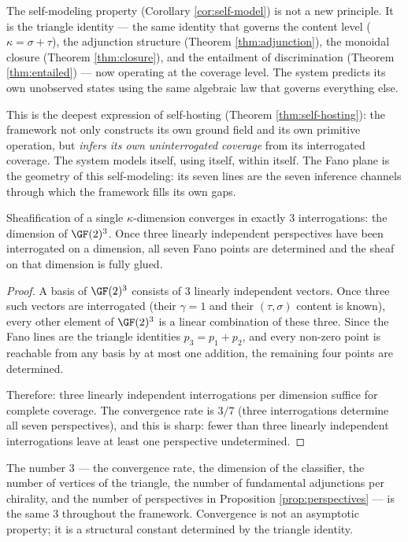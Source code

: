 \begin{remark}
The self-modeling property (Corollary \ref{cor:self-model})
is not a new principle. It is the triangle identity ---
the same identity that governs the content level
($\kappa = \sigma + \tau$), the adjunction structure
(Theorem \ref{thm:adjunction}), the monoidal closure
(Theorem \ref{thm:closure}), and the entailment of
discrimination (Theorem \ref{thm:entailed}) --- now
operating at the coverage level. The system predicts its
own unobserved states using the same algebraic law that
governs everything else.

This is the deepest expression of self-hosting
(Theorem \ref{thm:self-hosting}): the framework not only
constructs its own ground field and its own primitive
operation, but \emph{infers its own uninterrogated
coverage} from its interrogated coverage. The system
models itself, using itself, within itself. The Fano
plane is the geometry of this self-modeling: its seven
lines are the seven inference channels through which
the framework fills its own gaps.
\end{remark}

\begin{theorem}\label{thm:convergence}
Sheafification of a single $\kappa$-dimension converges in
exactly $3$ interrogations: the dimension of $\GF(2)^3$.
Once three linearly independent perspectives have been
interrogated on a dimension, all seven Fano points are
determined and the sheaf on that dimension is fully glued.
\end{theorem}

\begin{proof}
A basis of $\GF(2)^3$ consists of $3$ linearly independent
vectors. Once three such vectors are interrogated (their
$\gamma = 1$ and their $(\tau, \sigma)$ content is known),
every other element of $\GF(2)^3$ is a linear combination
of these three. Since the Fano lines are the triangle
identities $p_3 = p_1 + p_2$, and every non-zero point is
reachable from any basis by at most one addition, the
remaining four points are determined.

Therefore: three linearly independent interrogations per
dimension suffice for complete coverage. The convergence
rate is $3 / 7$ (three interrogations determine all seven
perspectives), and this is sharp: fewer than three linearly
independent interrogations leave at least one perspective
undetermined.
\end{proof}

\begin{corollary}
\label{cor:convergence-triangle}
The number $3$ --- the convergence rate, the dimension of
the classifier, the number of vertices of the triangle,
the number of fundamental adjunctions per chirality, and
the number of perspectives in Proposition
\ref{prop:perspectives} --- is the same $3$ throughout the
framework. Convergence is not an asymptotic property; it
is a structural constant determined by the triangle
identity.
\end{corollary}

